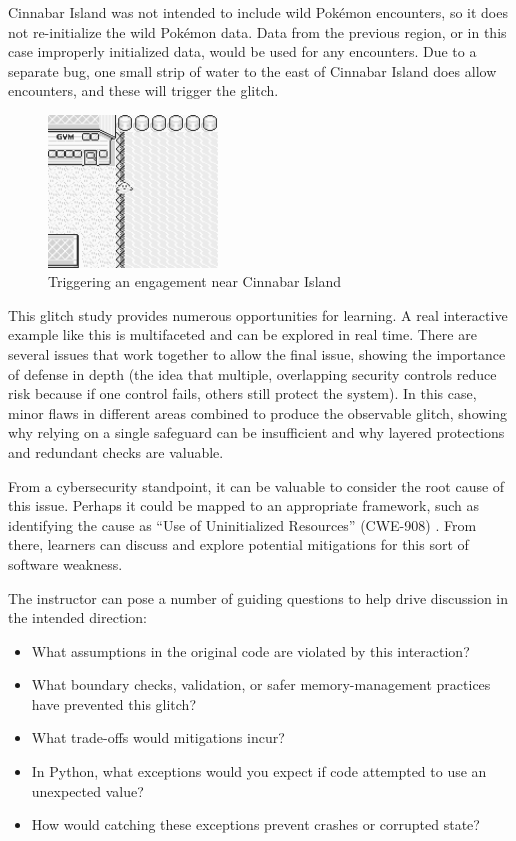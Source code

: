 \documentclass[letterpaper]{article}
\begin{document}
Cinnabar Island was not intended to include wild Pokémon encounters, so it does not re-initialize the wild Pokémon data. Data from the previous region, or in this case improperly initialized data, would be used for any encounters. Due to a separate bug, one small strip of water to the east of Cinnabar Island does allow encounters, and these will trigger the glitch.

\begin{figure}[h!]
    \centering
    \includegraphics[width=0.4\textwidth]{surfing.png}
    \caption{Triggering an engagement near Cinnabar Island}
\end{figure}

This glitch study provides numerous opportunities for learning. A real interactive example like this is multifaceted and can be explored in real time. There are several issues that work together to allow the final issue, showing the importance of defense in depth (the idea that multiple, overlapping security controls reduce risk because if one control fails, others still protect the system). In this case, minor flaws in different areas combined to produce the observable glitch, showing why relying on a single safeguard can be insufficient and why layered protections and redundant checks are valuable.

From a cybersecurity standpoint, it can be valuable to consider the root cause of this issue. Perhaps it could be mapped to an appropriate framework, such as identifying the cause as ``Use of Uninitialized Resources'' (CWE-908) \cite{mitre2012}. From there, learners can discuss and explore potential mitigations for this sort of software weakness.

The instructor can pose a number of guiding questions to help drive discussion in the intended direction:

\begin{itemize}
    \item What assumptions in the original code are violated by this interaction?
    \item What boundary checks, validation, or safer memory-management practices have prevented this glitch?
    \item What trade-offs would mitigations incur?
    \item In Python, what exceptions would you expect if code attempted to use an unexpected value?
    \item How would catching these exceptions prevent crashes or corrupted state?
\end{itemize}
\end{document}
